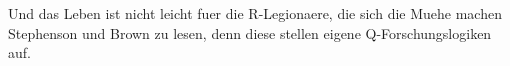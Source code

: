 Und das Leben ist nicht leicht fuer die R-Legionaere, die sich die Muehe machen Stephenson und Brown zu lesen, denn diese stellen eigene Q-Forschungslogiken auf.